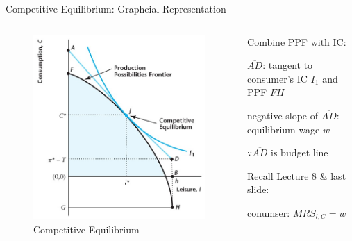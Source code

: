 \documentclass[11pt,aspectratio=169,usenames,dvipsnames]{beamer}
\let\tempone\itemize
\let\temptwo\enditemize
\renewenvironment{itemize}{\tempone\addtolength{\itemsep}{\fill}}{\temptwo}
\begin{document}
\begin{frame}{Competitive Equilibrium: Graphcial Representation}
\label{slide:Competitive_Equilibrium__Graphcial_Representation}
    \begin{columns}
        \begin{column}{0.5\textwidth}
            \begin{figure}
                \caption{\scriptsize Competitive Equilibrium}
                \includegraphics[width=.8\textwidth]{./figures/Figure5_3.jpg}
            \end{figure}
        \end{column}
        \begin{column}{0.5\textwidth}
            Combine PPF with IC:
            \begin{itemize}
                \item $\overline{AD}$: tangent to consumer's IC $ I_{1} $ and PPF $\overline{FH}$
                \item negative slope of $\overline{AD}$: equilibrium wage $ w $
                \begin{itemize}
                    \item $ \because \overline{AD}$ is budget line
                \end{itemize}
                \item Recall Lecture 8 \& last slide:
                \begin{itemize}
                    \item conumser: $ MRS_{l, C} = w $

\end{itemize}
\end{itemize}
\end{column}
\end{columns}
\end{frame}
\end{document}
